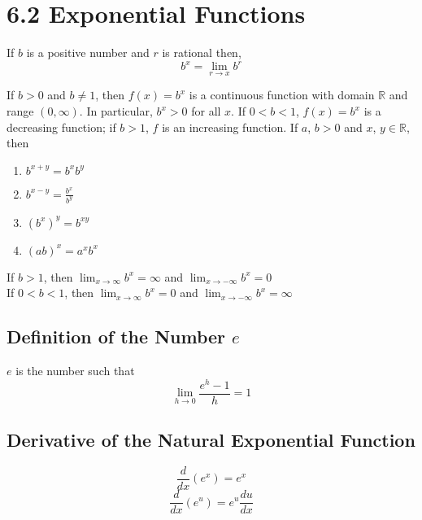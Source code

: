 %
%

\section*{6.2 Exponential Functions}

If \(b\) is a positive number and \(r\) is rational then,
\[ b^x= \lim_{r \to x}{b^r} \]

\begin{definition}
If \( b > 0 \) and \(b \neq 1 \), then \( f(x)=b^x \) is a continuous function with domain \( \mathbb{R} \) and range \( (0, \infty) \). In particular, \(b^x > 0\) for all \(x\). If \( 0 < b < 1 \), \(f(x) = b^x\) is a decreasing function; if \(b>1\), \(f\) is an increasing function. If \(a\), \(b > 0\) and \(x\), \(y \in \mathbb{R}\), then
\begin{enumerate}
\item \( b^{x+y}=b^x b^y \)
\item \( b^{x-y}=\frac{b^x}{b^y} \)
\item \( {(b^x)}^y=b^{xy} \)
\item \( {(ab)}^x = a^x b^x \)
\end{enumerate} 
\end{definition}
If \(b>1\), then \( \lim_{x \to \infty}{b^x} = \infty \) and \( \lim_{x \to -\infty}{b^x}=0 \)
\\
If \( 0<b<1 \), then \( \lim_{x \to \infty}{b^x} = 0 \) and \( \lim_{x \to -\infty}{b^x} = \infty \)

\subsection*{Definition of the Number \( e \)}
\(e\) is the number such that \[ \lim_{h \to 0}{\frac{e^h -1}{h}} =1 \]

\subsection*{Derivative of the Natural Exponential Function}
\[ \frac{d}{dx}(e^x)=e^x \]
\[ \frac{d}{dx}(e^u)=e^u \frac{du}{dx} \]

\begin{center}
\end{center}

